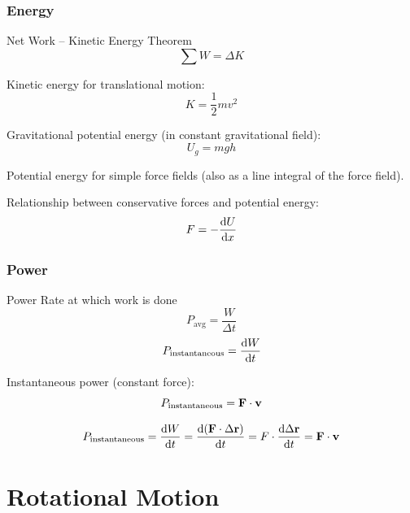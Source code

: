 \subsection{Energy}
\begin{thrm}{Net Work -- Kinetic Energy Theorem}{}
\begin{equation}
\sum W = \Delta K
\end{equation}
\end{thrm}

Kinetic energy for translational motion:
\begin{equation}
K=\frac{1}{2}mv^2
\end{equation}

Gravitational potential energy (in constant gravitational field):
\begin{equation}
U_g = mgh
\end{equation}

Potential energy for simple force fields (also as a line integral of the force field). 


Relationship between conservative forces and potential energy:
\begin{equation}
F = -\dv{U}{x}
\end{equation}


\subsection{Power}
\begin{defn}{Power}{}
Rate at which work is done
\begin{equation}
P_\text{avg} = \frac{W}{\Delta t}
\end{equation}
\begin{equation}
P_\text{instantaneous} = \dv{W}{t}
\end{equation}
\end{defn}

Instantaneous power (constant force):
\begin{equation}
P_\text{instantaneous} = \vb{F} \cdot \vb{v}
\end{equation}
\begin{derivation}
\[ P_\text{instantaneous} = \dv{W}{t} = \dv{(\vb{F}\cdot\Delta\vb{r})}{t} = F \cdot \dv{\Delta\vb{r}}{t} = \vb{F}\cdot\vb{v} \]
\end{derivation}

\pagebreak

\chapter{Rotational Motion}
